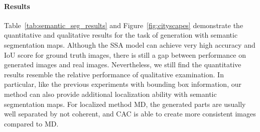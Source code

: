 \paragraph{Results}
Table~\ref{tab:semantic_seg_results} and Figure~\ref{fig:cityscapes} demonstrate the quantitative and qualitative results for the task of generation with semantic segmentation maps. Although the SSA model can achieve very high accuracy and IoU score for ground truth images, there is still a gap between performance on generated images and real images. Nevertheless, we still find the quantitative results resemble the relative performance of qualitative examination. In particular, like the previous experiments with bounding box information, our method can also provide additional localization ability with semantic segmentation maps. For localized method MD, the generated parts are usually well separated by not coherent, and CAC is able to create more consistent images compared to MD.
